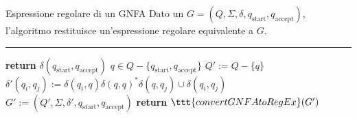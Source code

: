 \documentclass[a4paper, 12pt]{report}
\begin{document}
    \begin{framedalgo}[label={gnfa into regex}]{Espressione regolare di un GNFA}
        Dato un \GNFA $G = (Q, \Sigma, \delta, q_{\mathrm{start}}, q_{\mathrm{accept}})$, l'algoritmo restituisce un'espressione regolare equivalente a $G$.

        \hrule
        \begin{algorithmic}[1]
                \State \textbf{return} $\delta(q_{\mathrm{start}}, q_{\mathrm{accept}})$
                    \State $q \in Q - \{q_{\mathrm{start}}, q_{\mathrm{accept}}\}$
                    \State $Q' := Q - \{q\}$
                            \State $\delta'(q_i, q_j) := \delta(q_i, q)\delta(q, q)^* \delta(q, q_j) \cup \delta(q_i, q_j)$
                        \EndFor
                    \EndFor
                    \State $G' := (Q', \Sigma, \delta', q_{\mathrm{start}}, q_{\mathrm{accept}})$
                    \State \textbf{return} $\ttt{convertGNFAtoRegEx}(G')$
                \EndIf
            \EndFunction
        \end{algorithmic}
    \end{framedalgo}
\end{document}
